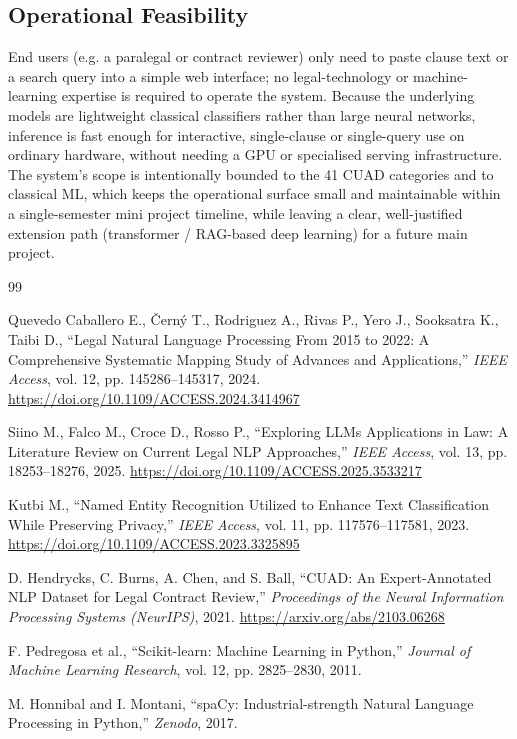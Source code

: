 \documentclass[12pt, a4paper]{report}
\begin{document}
\subsection{Operational Feasibility}
End users (e.g. a paralegal or contract reviewer) only need to paste clause text or a search query into a simple web interface; no legal-technology or machine-learning expertise is required to operate the system.
Because the underlying models are lightweight classical classifiers rather than large neural networks, inference is fast enough for interactive, single-clause or single-query use on ordinary hardware, without needing a GPU or specialised serving infrastructure.
The system's scope is intentionally bounded to the 41 CUAD categories and to classical ML, which keeps the operational surface small and maintainable within a single-semester mini project timeline, while leaving a clear, well-justified extension path (transformer / RAG-based deep learning) for a future main project.

\newpage

\begin{thebibliography}{99}

Quevedo Caballero E., Černý T., Rodriguez A., Rivas P., Yero J., Sooksatra K., Taibi D.,
``Legal Natural Language Processing From 2015 to 2022: A Comprehensive Systematic Mapping Study of Advances and Applications,''
\textit{IEEE Access}, vol. 12, pp. 145286--145317, 2024.
\url{https://doi.org/10.1109/ACCESS.2024.3414967}

Siino M., Falco M., Croce D., Rosso P.,
``Exploring LLMs Applications in Law: A Literature Review on Current Legal NLP Approaches,''
\textit{IEEE Access}, vol. 13, pp. 18253--18276, 2025.
\url{https://doi.org/10.1109/ACCESS.2025.3533217}

Kutbi M.,
``Named Entity Recognition Utilized to Enhance Text Classification While Preserving Privacy,''
\textit{IEEE Access}, vol. 11, pp. 117576--117581, 2023.
\url{https://doi.org/10.1109/ACCESS.2023.3325895}

D. Hendrycks, C. Burns, A. Chen, and S. Ball,
``CUAD: An Expert-Annotated NLP Dataset for Legal Contract Review,''
\textit{Proceedings of the Neural Information Processing Systems (NeurIPS)}, 2021.
\url{https://arxiv.org/abs/2103.06268}

F. Pedregosa et al.,
``Scikit-learn: Machine Learning in Python,''
\textit{Journal of Machine Learning Research}, vol. 12, pp. 2825--2830, 2011.

M. Honnibal and I. Montani,
``spaCy: Industrial-strength Natural Language Processing in Python,''
\textit{Zenodo}, 2017.

\end{thebibliography}
\end{document}
